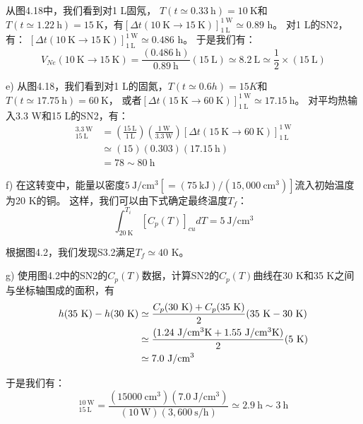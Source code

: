 从图4.18中，我们看到对1 L固氖， $T(t\simeq 0.33\ \mathrm{h})=10\ \mathrm{K}$和$T(t\simeq
1.22\ \mathrm{h})=15\ \mathrm{K}$，有$[\Delta t(10\ \mathrm{K}\rightarrow 15\ \mathrm{K})]_{1\ \mathrm{L}}^{1\ \mathrm{W}}\simeq 0.89$ h。
对1 L的SN2，有：
$[\Delta t(10\ \mathrm{K}\rightarrow 15\ \mathrm{K})]_{1\ \mathrm{L}}^{1\ \mathrm{W}}\simeq 0.486$ h。
于是我们有：
\begin{equation*}%
V_{Ne}(10\ \mathrm{K}\rightarrow 15\ \mathrm{K})=\frac{(0.486\ \mathrm{h})}{0.89\ \mathrm{h}}(15\ \mathrm{L})\simeq 8.2 \ \mathrm{L}\simeq\frac{1}{2}\times(15\ \mathrm{L})
\end{equation*}

e) 从图4.18，我们看到对1 L的固氮，$T(t\simeq 0.6 h)=15 K$和$T(t\simeq 17.75\ \mathrm{h}) = 60\ \mathrm{K}$，
或者$[\Delta t(15\ \mathrm{K}\rightarrow 60\ \mathrm{K})]_{1\ \mathrm{L}}^{1\ \mathrm{W}}\simeq 17.15\ \mathrm{h}$。
对平均热输入3.3 W和15 L的SN2，有：
\begin{align*}%
[\Delta t(15\ \mathrm{K} \rightarrow 60\ \mathrm{K})]_{15\ \mathrm{L}}^{3.3\ \mathrm{W}}&=(\frac{15\ \mathrm{L}}{1\ \mathrm{L}})(\frac{1\ \mathrm{W}}{3.3\ \mathrm{W}})[\Delta t(15\ \mathrm{K}\rightarrow 60\ \mathrm{K})]_{1\ \mathrm{L}}^{1\ \mathrm{W}}\\
&\simeq(15)(0.303)(17.15\ \mathrm{h})\\
&=78\sim 80\ \mathrm{h}
\end{align*}

f) 在这转变中，能量以密度$5\ \mathrm{J/cm^3}[= (75\ \mathrm{kJ})/(15,000\ \mathrm{cm^3})]$流入初始温度为20 K的铜。
这样，我们可以由下式确定最终温度$T_f$：
\begin{equation*}%
\int_{20\ \mathrm{K}}^{T_i}[C_p(T)]_{cu}dT=5\ \mathrm{J/cm^3}
\end{equation*}

根据图4.2，我们发现S3.2满足$T_f\simeq 40$ K。

g) 使用图4.2中的SN2的$C_p(T)$数据，计算SN2的$C_p(T)$曲线在30 K和35 K之间
与坐标轴围成的面积，有
\begin{align*}%
h(35\ \mathrm{K})-h(30\ \mathrm{K})&\simeq\frac{C_p(30\ \mathrm{K})+C_p(35\ \mathrm{K})}{2}(35\ \mathrm{K}-30\ \mathrm{K})\\\notag
&\simeq\frac{(1.24\ \mathrm{J/cm^3 K}+1.55\ \mathrm{J/cm^3 K})}{2}(5\ \mathrm{K})\\\notag
&\simeq 7.0\ \mathrm{J/cm^3}
\end{align*}

于是我们有：
\begin{equation*}%
[\Delta t(30\ \mathrm{K} \rightarrow 35\ \mathrm{K})]_{15\ \mathrm{L}}^{10\ \mathrm{W}}=\frac{(15000\ \mathrm{cm^3})(7.0\ \mathrm{J/cm^3})}{(10\ \mathrm{W})(3,600\ \mathrm{s/h})}
\simeq 2.9\ \mathrm{h}\sim 3\ \mathrm{h}
\end{equation*}

